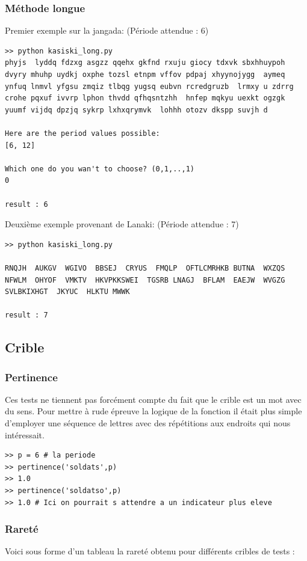 \documentclass[a4paper, 11pt]{article}
\begin{document}
\subsubsection{Méthode longue}
Premier exemple sur la jangada: (Période attendue : 6)\\

\begin{lstlisting}
>> python kasiski_long.py 
phyjs  lyddq fdzxg asgzz qqehx gkfnd rxuju giocy tdxvk sbxhhuypoh  dvyry mhuhp uydkj oxphe tozsl etnpm vffov pdpaj xhyynojygg  aymeq ynfuq lnmvl yfgsu zmqiz tlbqg yugsq eubvn rcredgruzb  lrmxy u zdrrg crohe pqxuf ivvrp lphon thvdd qfhqsntzhh  hnfep mqkyu uexkt ogzgk yuumf vijdq dpzjq sykrp lxhxqrymvk  lohhh otozv dkspp suvjh d

Here are the period values possible:
[6, 12]

Which one do you wan't to choose? (0,1,..,1)
0

result : 6
\end{lstlisting}

Deuxième exemple provenant de Lanaki: (Période attendue : 7)
\begin{lstlisting}
>> python kasiski_long.py 

RNQJH  AUKGV  WGIVO  BBSEJ  CRYUS  FMQLP  OFTLCMRHKB BUTNA  WXZQS  NFWLM  OHYOF  VMKTV  HKVPKKSWEI  TGSRB LNAGJ  BFLAM  EAEJW  WVGZG  SVLBKIXHGT  JKYUC  HLKTU MWWK

result : 7
\end{lstlisting}


\subsection{Crible}

\subsubsection{Pertinence}
Ces tests ne tiennent pas forcément compte du fait que le crible est
un mot avec du sens.
Pour mettre à rude épreuve la logique de la fonction il était plus
simple d'employer une séquence de lettres avec des répétitions aux
endroits qui nous intéressait.

\begin{lstlisting}
>> p = 6 # la periode
>> pertinence('soldats',p)
>> 1.0
>> pertinence('soldatso',p)
>> 1.0 # Ici on pourrait s attendre a un indicateur plus eleve
\end{lstlisting}

\subsubsection{Rareté}
Voici sous forme d'un tableau la rareté obtenu pour différents cribles
de tests : \\
\end{document}
